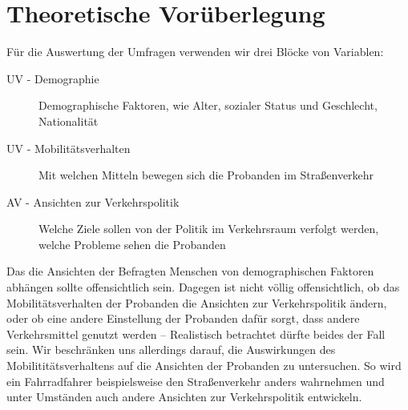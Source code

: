 
\section{Theoretische Vorüberlegung}

Für die Auswertung der Umfragen verwenden wir drei Blöcke von Variablen:
\begin{description}
	\item[UV - Demographie] Demographische Faktoren, wie Alter, sozialer Status und Geschlecht, Nationalität
	\item[UV - Mobilitätsverhalten] Mit welchen Mitteln bewegen sich die Probanden im Straßenverkehr
	\item[AV - Ansichten zur Verkehrspolitik] Welche Ziele sollen von der Politik im Verkehrsraum verfolgt werden, welche Probleme sehen die Probanden
\end{description}
Das die Ansichten der Befragten Menschen von demographischen Faktoren abhängen sollte offensichtlich sein.
Dagegen ist nicht völlig offensichtlich, ob das Mobilitätsverhalten der Probanden die Ansichten zur Verkehrspolitik ändern, oder ob eine andere Einstellung der Probanden dafür sorgt, dass andere Verkehrsmittel genutzt werden – Realistisch betrachtet dürfte beides der Fall sein.
Wir beschränken uns allerdings darauf, die Auswirkungen des Mobilititätsverhaltens auf die Ansichten der Probanden zu untersuchen.
So wird ein Fahrradfahrer beispielsweise den Straßenverkehr anders wahrnehmen und unter Umständen auch andere Ansichten zur Verkehrspolitik entwickeln.



